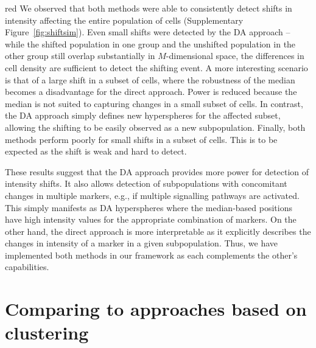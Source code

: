 \documentclass{article}
\begin{document}
\begin{color}{red}
We observed that both methods were able to consistently detect shifts in intensity affecting the entire population of cells (Supplementary Figure~\ref{fig:shiftsim}).
Even small shifts were detected by the DA approach -- while the shifted population in one group and the unshifted population in the other group still overlap substantially in $M$-dimensional space, the differences in cell density are sufficient to detect the shifting event.
A more interesting scenario is that of a large shift in a subset of cells, where the robustness of the median becomes a disadvantage for the direct approach.
Power is reduced because the median is not suited to capturing changes in a small subset of cells.
In contrast, the DA approach simply defines new hyperspheres for the affected subset, allowing the shifting to be easily observed as a new subpopulation.
Finally, both methods perform poorly for small shifts in a subset of cells.
This is to be expected as the shift is weak and hard to detect.

These results suggest that the DA approach provides more power for detection of intensity shifts.
It also allows detection of subpopulations with concomitant changes in multiple markers, e.g., if multiple signalling pathways are activated.
This simply manifests as DA hyperspheres where the median-based positions have high intensity values for the appropriate combination of markers.
On the other hand, the direct approach is more interpretable as it explicitly describes the changes in intensity of a marker in a given subpopulation.
Thus, we have implemented both methods in our framework as each complements the other's capabilities.

\section{Comparing to approaches based on clustering}


\end{color}
\end{document}
